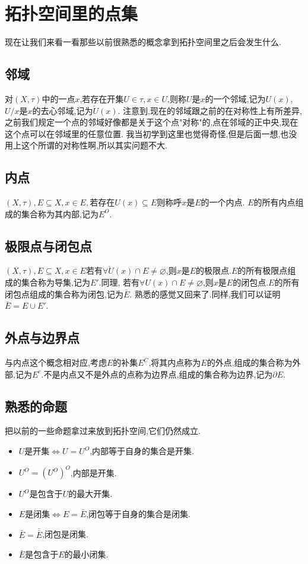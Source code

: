 \documentclass[12pt, a4paper, oneside]{ctexbook}
\begin{document}
\section{拓扑空间里的点集}
  现在让我们来看一看那些以前很熟悉的概念拿到拓扑空间里之后会发生什么.
  \subsection{邻域}
  对$(X,\tau)$中的一点$x$,若存在开集$U\in\tau, x\in U$,则称$U$是$x$的一个邻域,记为$U(x)$,$U/x$是$x$的去心邻域,记为$\check{U}(x) $.
  注意到,现在的邻域跟之前的在对称性上有所差异,之前我们规定一个点的邻域好像都是关于这个点"对称"的,点在邻域的正中央,现在这个点可以在邻域里的任意位置.
  我当初学到这里也觉得奇怪,但是后面一想,也没用上这个所谓的对称性啊,所以其实问题不大.
  \subsection{内点}
  $(X,\tau), E\subseteq X,x\in E,\text{若存在} U(x)\subseteq E$则称呼$x$是$E$的一个内点. $E$的所有内点组成的集合称为其内部,记为$E^O$.
  \subsection{极限点与闭包点}
  $(X,\tau), E\subseteq X,x\in E$若有$\forall\check{U}(x)\cap E\neq\varnothing$,则$x$是$E$的极限点.$E$的所有极限点组成的集合称为导集,记为$E'$.同理,
  若有$\forall U(x)\cap E\neq\varnothing$,则$x$是$E$的闭包点.$E$的所有闭包点组成的集合称为闭包,记为$\bar{E}$.
  熟悉的感觉又回来了.同样,我们可以证明$\bar{E}=E\cup E'$.
  \subsection{外点与边界点}
  与内点这个概念相对应,考虑$E$的补集$E^C$,将其内点称为$E$的外点,组成的集合称为外部,记为$E^e$.不是内点又不是外点的点称为边界点,组成的集合称为边界,记为$\partial E$.
  \subsection{熟悉的命题}
  把以前的一些命题拿过来放到拓扑空间,它们仍然成立.
  \begin{itemize}
    \item $U\text{是开集}\Leftrightarrow U=U^O$,内部等于自身的集合是开集.
    \item $U^O=(U^O)^O$,内部是开集.
    \item $U^O$是包含于$U$的最大开集.
    \item $E\text{是闭集}\Leftrightarrow E=\bar{E}$,闭包等于自身的集合是闭集.
    \item $\bar{E}=\bar{\bar{E}}$,闭包是闭集.
    \item $\bar{E}$是包含于$E$的最小闭集.
  \end{itemize}
\end{document}
